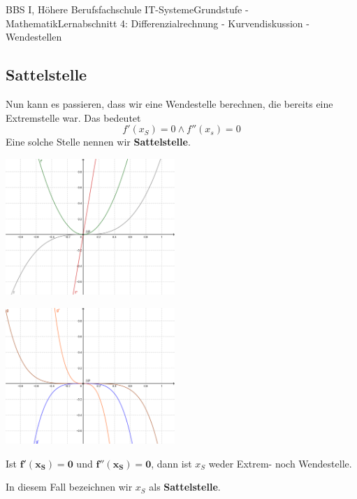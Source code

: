 \documentclass[11pt,twocolumn,oneside,openany,headings=optiontotoc,11pt,numbers=noenddot]{article}
\begin{document}
\begin{worksheet}{BBS I, Höhere Berufsfachschule IT-Systeme}{Grundstufe - Mathematik}{Lernabschnitt 4: Differenzialrechnung - Kurvendiskussion - Wendestellen}
		\subsection{Sattelstelle}
		Nun kann es passieren, dass wir eine Wendestelle berechnen, die bereits eine Extremstelle war. Das bedeutet \[f'(x_S) = 0 \wedge f''(x_s) = 0\] Eine solche Stelle nennen wir \textbf{Sattelstelle}.\\
		\par\noindent
		\includegraphics[width=0.48\textwidth]{../99_Bilder/045_SaS_Bsp1.png}\\
		\par\noindent
		\includegraphics[width=0.48\textwidth]{../99_Bilder/045_SaS_Bsp2.png}
		\begin{framed}
			\noindent
			Ist \(\mathbf{f'(x_S) = 0}\) und \(\mathbf{f''(x_S) = 0}\), dann ist \(x_S\) weder Extrem- noch Wendestelle.\\
			\par\noindent
			In diesem Fall bezeichnen wir \(x_S\) als \textbf{Sattelstelle}.
		\end{framed}
	\end{worksheet}
\end{document}
